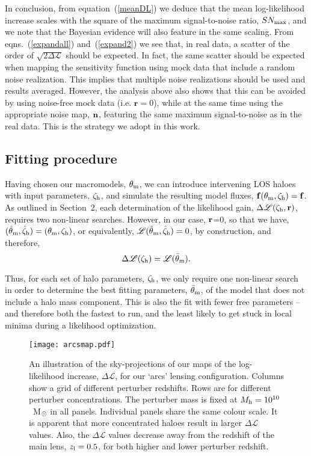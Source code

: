 \documentclass[a4paper, fleqn, usenatbib, useAMS]{mnras}
\def\zh{\zeta_{\rm h}}
\def\tm{\theta_{\rm m}}
\def\DL{\Delta\mathscr{L}}
\begin{document}
In conclusion, from equation~(\ref{meanDL}) we deduce that the mean log-likelihood increase scales with the square 
of the maximum signal-to-noise ratio, $SN_{\rm max}$, and we note that the Bayesian
evidence will also feature in the same scaling. 
From eqns.~(\ref{expandall}) and~(\ref{expand2}) we see that, in real data, 
a scatter of the order of $\sqrt{2\DL }$ should be expected. 
In fact, the same scatter should be expected when mapping the sensitivity function using mock data that include a random noise realization. This implies that multiple noise realizations should be used and results averaged. However, the analysis 
above also shows that this can be avoided by using noise-free mock data (i.e. $\textbf{r}=0$), while at the same time
using the appropriate noise map, $\bf n$, featuring the same maximum signal-to-noise as in the real data. This is 
the strategy we adopt in this work.


\subsection{Fitting procedure}

Having chosen our macromodels, $\tm$, we can introduce intervening LOS haloes with input parameters, ${\zeta}_{\rm h}$, 
and simulate the resulting model fluxes, $\bf{f}(\tm, {\zeta}_{\rm h})=\bf f$.
As outlined in Section~2, each determination of the likelihood gain, $\DL({\zeta}_{\rm h}, \bf{r})$, requires two 
non-linear searches. However, in our case, $\bf r$=0, so that we have, $(\hat\theta_{\rm m}, \hat\zh)=(\tm, \zh)$, 
or equivalently, $\mathscr{L}(\hat\theta_{\rm m}, \hat\zh)=0$, by construction, and therefore, 
%
\begin{equation}
\DL(\zh) = \mathscr{L}(\bar\theta_{\rm m}) .
\label{DLsimple}
\end{equation}

Thus, for each set of halo parameters, $\zh$, we only require one non-linear search in order to determine the 
best fitting parameters, $\bar\theta_{\rm m}$, of the model that does not include a halo mass component. This is also the fit with fewer free parameters -- and therefore both the fastest to run, and the least likely to get stuck in local minima during a likelihood optimization.

\begin{figure*}
\centering
\texttt{[image: arcsmap.pdf]}
\caption{An illustration of the sky-projections of our maps of the
  log-likelihood increase, $\DL$, for our `arcs' lensing
  configuration. Columns show a grid of different perturber
  redshifts. Rows are for different perturber concentrations. The
  perturber mass is fixed at $M_{\rm h}=10^{10}$~M$_{\rm \odot}$ in
  all panels. Individual panels share the same colour scale. It is apparent that more concentrated haloes 
result in larger $\DL$ values. Also, the $\DL$ values decrease away from the redshift of the main lens, $z_{\rm l}=0.5$, for both higher and lower perturber redshift.}
\label{arcsmap}
\end{figure*}
\end{document}
